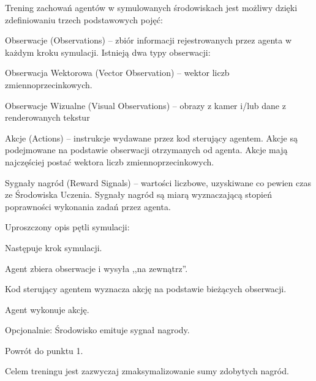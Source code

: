 \vspace{1cm}
Trening zachowań agentów w symulowanych środowiskach jest możliwy dzięki zdefiniowaniu trzech podstawowych pojęć:
\begin{enumerate*}
\item Obserwacje (Observations) -- zbiór informacji rejestrowanych przez agenta w każdym kroku symulacji. 
Istnieją dwa typy obserwacji:
\begin{itemize*}
\item Obserwacja Wektorowa (Vector Observation) -- wektor liczb zmiennoprzecinkowych.
\item Obserwacje Wizualne (Visual Observations) -- obrazy z kamer i/lub dane z renderowanych tekstur
\end{itemize*}
\item Akcje (Actions) -- instrukcje wydawane przez kod sterujący agentem. Akcje są podejmowane na podstawie obserwacji otrzymanych od agenta. Akcje mają najczęściej postać wektora liczb zmiennoprzecinkowych.
\item Sygnały nagród (Reward Signals) -- wartości liczbowe, uzyskiwane co pewien czas ze Środowiska Uczenia. Sygnały nagród są miarą wyznaczającą stopień poprawności wykonania zadań przez agenta.
\end{enumerate*}

Uproszczony opis pętli symulacji:
\begin{enumerate*}
\item Następuje krok symulacji.
\item Agent zbiera obserwacje i wysyła ,,na zewnątrz''.
\item Kod sterujący agentem wyznacza akcję na podstawie bieżących obserwacji.
\item Agent wykonuje akcję.
\item Opcjonalnie: Środowisko emituje sygnał nagrody.
\item Powrót do punktu 1.
\end{enumerate*}
Celem treningu jest zazwyczaj zmaksymalizowanie sumy zdobytych nagród.

